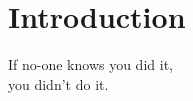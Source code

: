 \section{Introduction}
\label{sec:introduction}

\begin{frame}[plain,c]
\begin{center}
    \Huge{If no-one knows you did it,\\%
    you didn't do it.}
\end{center}
\end{frame}

